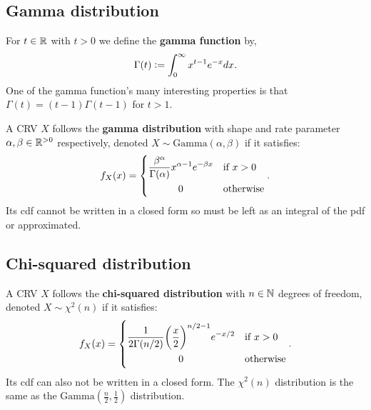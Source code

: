\documentclass[../Year1/Year1.tex]{subfiles}
\begin{document}
\subsection{Gamma distribution}

\begin{definition}
    For $t\in\mathbb{R}$ with $t>0$ we define the \textbf{gamma function} by, \[
    \Gamma(t) := \int_0^\infty x^{t-1}e^{-x}dx
    \textcolor{black}{.}\]
    One of the gamma function's many interesting properties is that $\Gamma(t) = (t-1)\Gamma(t-1)$ for $t>1$.
\end{definition}

\begin{definition}
    A CRV $X$ follows the \textbf{gamma distribution} with shape and rate parameter $\alpha,\beta\in\mathbb{R}^{>0}$ respectively, denoted $X\sim \text{Gamma}(\alpha,\beta)$ if it satisfies: \[
        f_X(x) = \begin{dcases}
            \frac{\beta^\alpha}{\Gamma(\alpha)}x^{\alpha-1}e^{-\beta x} & \text{\textcolor{black}{if }$x>0$} \\
            \omit\hfil0\hfil & \text{\textcolor{black}{otherwise}}
        \end{dcases}\textcolor{black}{.}
    \]
    Its cdf cannot be written in a closed form so must be left as an integral of the pdf or approximated.
\end{definition}
\subsection{Chi-squared distribution}
\begin{definition}
    A CRV $X$ follows the \textbf{chi-squared distribution} with $n\in\mathbb{N}$ degrees of freedom, denoted $X\sim \chi^2(n)$ if it satisfies: \[
        f_X(x) = \begin{dcases}
            \frac{1}{2\Gamma(n/2)}{\left(\frac{x}{2}\right)}^{n/2-1}e^{-x/2} & \text{\textcolor{black}{if }$x>0$} \\
            \omit\hfil0\hfil & \text{\textcolor{black}{otherwise}}
        \end{dcases}\textcolor{black}{.}
    \]
    Its cdf can also not be written in a closed form. The $\chi^2(n)$ distribution is the same as the $\text{Gamma}(\frac{n}{2},\frac{1}{2})$ distribution.
\end{definition}
\end{document}
